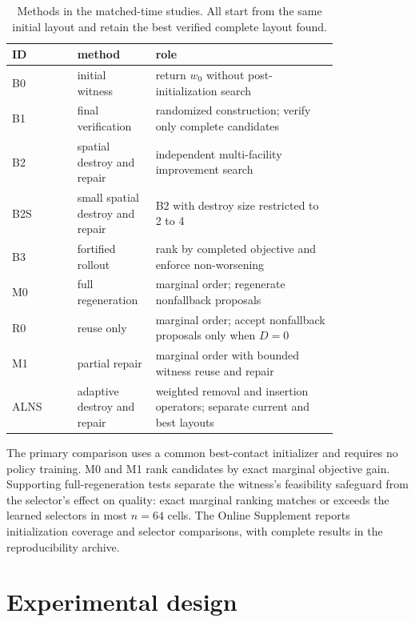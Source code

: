 \documentclass[preprint,12pt,authoryear,nonatbib]{elsarticle}
\begin{document}
\begin{table}[t]
\centering
\caption{Methods in the matched-time studies. All start from the same initial layout
and retain the best
verified complete layout found.}
\label{tab:sharedmethods}
\small
\begin{tabular}{@{}l>{\raggedright\arraybackslash}p{0.24\linewidth}>{\raggedright\arraybackslash}p{0.57\linewidth}@{}}
\toprule
ID & method & role \\
\midrule
B0 & initial witness & return $w_0$ without post-initialization search \\
B1 & final verification & randomized construction; verify only complete candidates \\
B2 & spatial destroy and repair & independent multi-facility improvement search \\
B2S & small spatial destroy and repair & B2 with destroy size restricted to 2 to 4 \\
B3 & fortified rollout & rank by completed objective and enforce non-worsening \\
M0 & full regeneration & marginal order; regenerate nonfallback proposals \\
R0 & reuse only & marginal order; accept nonfallback proposals only when $D=0$ \\
M1 & partial repair & marginal order with bounded witness reuse and repair \\
ALNS & adaptive destroy and repair & weighted removal and insertion operators; separate current and best layouts \\
\bottomrule
\end{tabular}
\end{table}


The primary comparison uses a common best-contact initializer and requires
no policy training. M0 and M1 rank candidates by exact marginal objective
gain. Supporting full-regeneration tests separate the witness's feasibility
safeguard from the selector's effect on quality: exact marginal ranking
matches or exceeds the learned selectors in most $n=64$ cells. The Online
Supplement reports initialization coverage and selector comparisons, with
complete results in the reproducibility archive.

\section{Experimental design}
\label{sec:protocol}
\end{document}
